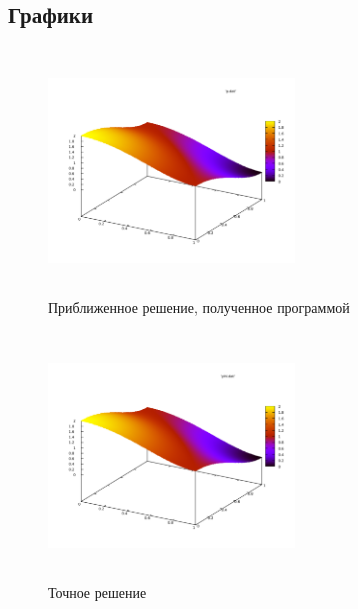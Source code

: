 \documentclass [12pt, a4paper] {article}
\begin{document}
\subsection{Графики}
\begin{figure}[h]
    \centering
    \includegraphics[height=185pt, width=185pt]{p.pdf}
    \caption{Приближенное решение, полученное программой}
\end{figure}
\begin{figure}[h]
    \centering
    \includegraphics[height=185pt, width=185pt]{phi.pdf}
    \caption{Точное решение}
\end{figure}
\end{document}
